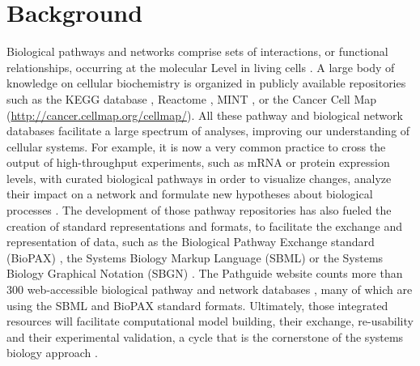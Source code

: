 \documentclass[10pt]{bmc_article}
\newenvironment{bmcformat}{\baselineskip20pt\sloppy\setboolean{publ}{false}}{\baselineskip20pt\sloppy}
\begin{document}
\begin{bmcformat}
\section*{Background}

Biological pathways and networks comprise sets of interactions, or functional
relationships, occurring at the molecular Level in living cells
\cite{adriaens2008public, cary2005pathway}.
A large body of knowledge on cellular biochemistry is organized in publicly available
repositories such as the KEGG database \cite{ogata1999kegg}, Reactome
\cite{joshi2005reactome}, MINT \cite{zanzoni2002mint}, or the Cancer Cell Map
(\url{http://cancer.cellmap.org/cellmap/}). All these pathway and biological
network databases facilitate a large spectrum of analyses, improving our
understanding of cellular systems. For example, it is now a very common
practice to cross the output of high-throughput experiments, such as mRNA or
protein expression levels, with curated biological pathways in
order to visualize changes, analyze their impact on a network and
formulate new hypotheses about
biological processes \cite{saraiya2005visualizing,
gehlenborg2010visualization}. The development of those pathway repositories has
also fueled the creation of standard representations and formats, to facilitate
the exchange and representation of data, such as the Biological Pathway
Exchange standard (BioPAX) \cite{demir2010biopax}, the Systems Biology Markup
Language (SBML) \cite{hucka2003systems} or the Systems Biology Graphical
Notation (SBGN) \cite{le2009systems}. The Pathguide website counts
more than 300 web-accessible biological pathway and network databases
\cite{bader2006pathguide}, many of which are using the SBML and BioPAX standard
formats. Ultimately, those integrated resources will facilitate computational
model building, their exchange, re-usability and their experimental validation, a cycle that is the
cornerstone of the systems biology approach \cite{karlebach2008modelling,
kitano2002systems, ideker2001new}.


\end{bmcformat}
\end{document}
